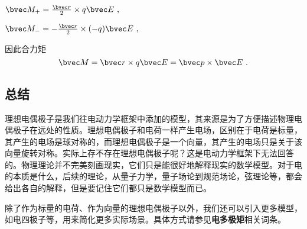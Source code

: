 $\bvec M_+= \frac{\bvec r}{2} \times q\bvec E~,$

$\bvec M_-= - \frac{\bvec r}{2} \times (-q)\bvec E~,$

因此合力矩 
\begin{equation}
\bvec M = \bvec r \times q \bvec E = \bvec p \times \bvec E~.
\end{equation}

\subsection{总结}

理想电偶极子是我们往电动力学框架中添加的模型，其来源是为了方便描述物理电偶极子在远处的性质。理想电偶极子和电荷一样产生电场，区别在于电荷是标量，其产生的电场是球对称的，而理想电偶极子是一个向量，其产生的电场只是关于该向量旋转对称。实际上存不存在理想电偶极子呢？这是电动力学框架下无法回答的。物理理论并不完美刻画现实，它们只是能很好地解释现实的数学模型。对于电的本质是什么，后续的理论，从量子力学，量子场论到规范场论，弦理论等，都会给出各自的解释，但是要记住它们都只是数学模型而已。

除了作为标量的电荷、作为向量的理想电偶极子以外，我们还可以引入更多模型，如电四极子等，用来简化更多实际场景。具体方式请参见\textbf{电多极矩}相关词条。

